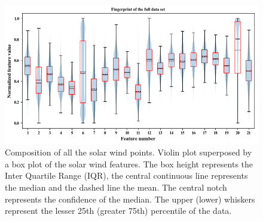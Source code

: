 \documentclass[utf8]{frontiersSCNS} %
\begin{document}
\begin{figure}[h!]
	\begin{center}
		\includegraphics[width=14cm]{datarange}%
	\end{center}
	\caption{Composition of all the solar wind points. Violin plot superposed by a box plot of the solar wind features. The box height represents the Inter Quartile Range (IQR), the central continuous line represents the median and the dashed line the mean. The central notch represents the confidence of the median. The upper (lower) whiskers represent the lesser 25th (greater 75th) percentile of the data. }\label{fig:datarange}
\end{figure}
\end{document}
